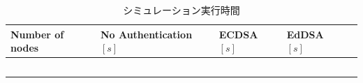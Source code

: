 \begin{longtable}{
    >{\raggedright\arraybackslash}p{3cm}
    >{\raggedright\arraybackslash}p{3.7cm}
    >{\raggedright\arraybackslash}p{2.5cm}
    >{\raggedright\arraybackslash}p{2.5cm}
    >{\raggedright\arraybackslash}p{2.5cm}
  }
  \caption{シミュレーション実行時間}
  \label{tab:exp3_simtime} \\
  \endfirsthead
  \hline
  Number of nodes & No Authentication $[s]$ & ECDSA $[s]$ & EdDSA $[s]$ \\ \hline \hline
  \multicolumn{1}{c}{$37$} &
  \multicolumn{1}{c}{$14.1802$} &
  \multicolumn{1}{l}{$55.0108$} &
  \multicolumn{1}{l}{$24.4069$} \\
  \multicolumn{1}{c}{$74$} &
  \multicolumn{1}{c}{$50.5984$} &
  \multicolumn{1}{l}{$194.408$} &
  \multicolumn{1}{l}{$89.2728$} \\
  \multicolumn{1}{c}{$112$} &
  \multicolumn{1}{c}{$110.405$} &
  \multicolumn{1}{l}{$436.926$} &
  \multicolumn{1}{l}{$200.901$} \\
  \multicolumn{1}{c}{$148$} &
  \multicolumn{1}{c}{$196.971$} &
  \multicolumn{1}{l}{$910.373$} &
  \multicolumn{1}{l}{$431.346$} \\
  \multicolumn{1}{c}{$185$} &
  \multicolumn{1}{c}{$345.059$} &
  \multicolumn{1}{l}{$1324.55$} &
  \multicolumn{1}{l}{$635.155$} \\ \hline

\end{longtable}

